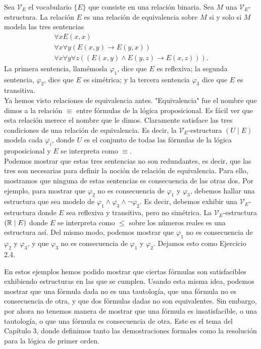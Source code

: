 \message{ !name(main.tex)}\documentclass[12pt,a4paper]{book}
\newcommand{\comillas}[1]{"#1"}
\newcommand{\VV}{\mathcal{V}}
\begin{document}
    \begin{ejemplo}\label{ej:relacion-equivalencia-fol}
        Sea $\VV_{E}$ el vocabulario $\{E\}$ que consiste en una relación binaria. Sea $M$ una $\VV_{E}$-estructura. La
        relación $E$ es una relación de equivalencia sobre $M$ si y solo si $M$ modela las tres sentencias
        \begin{gather*}
            \forall xE(x,x)\\
            \forall x\forall y(E(x,y)\rightarrow E(y,x))\\
            \forall x\forall y\forall z((E(x,y)\wedge E(y,z)\rightarrow E(x,z))).
        \end{gather*}
        La primera sentencia, llamémosla $\varphi_{1}$, dice que $E$ es reflexiva; la segunda sentencia, $\varphi_{2}$, dice
        que $E$ es simétrica; y la tercera sentencia $\varphi_{3}$ dice que $E$ es transitiva.\\
        Ya hemos visto relaciones de equivalencia antes. \comillas{Equivalencia} fue el nombre que dimos a la relación
        $\equiv$ entre fórmulas de la lógica proposicional. Es fácil ver que esta relación merece el nombre que le dimos.
        Claramente satisface las tres condiciones de una relación de equivalencia. Es decir, la $\VV_{E}$-estructura
        $(U\mid E)$ modela cada $\varphi_{i}$, donde $U$ es el conjunto de todas las fórmulas de la lógica proposicional y
        $E$ se interpreta como $\equiv$.\\
        Podemos mostrar que estas tres sentencias no son redundantes, es decir, que las tres son necesarias para definir la
        noción de relación de equivalencia. Para ello, mostramos que ninguna de estas sentencias es consecuencia de las
        otras dos. Por ejemplo, para mostrar que $\varphi_{2}$ no es consecuencia de $\varphi_{1}$ y $\varphi_{3}$, debemos
        hallar una estructura que sea modelo de $\varphi_{1}\wedge\varphi_{3}\wedge\neg\varphi_{2}$. Es decir, debemos
        exhibir una $\VV_{E}$-estructura donde $E$ sea reflexiva y transitiva, pero no simétrica. La $\VV_{E}$-estructura
        $(\mathbb{R}\mid E)$ donde $E$ se interpreta como $\leq$ sobre los números reales es una estructura así. Del mismo modo,
        podemos mostrar que $\varphi_{1}$ no es consecuencia de $\varphi_{2}$ y $\varphi_{3}$, y que $\varphi_{3}$ no es
        consecuencia de $\varphi_{1}$ y $\varphi_{2}$. Dejamos esto como Ejercicio 2.4.
    \end{ejemplo}

    En estos ejemplos hemos podido mostrar que ciertas fórmulas son satisfacibles exhibiendo estructuras en las que se
    cumplen. Usando esta misma idea, podemos mostrar que una fórmula dada no es una tautología, que una fórmula no es
    consecuencia de otra, y que dos fórmulas dadas no son equivalentes. Sin embargo, por ahora no tenemos manera de mostrar
    que una fórmula es insatisfacible, o una tautología, o que una fórmula es consecuencia de otra. Este es el tema del
    Capítulo 3, donde definimos tanto las demostraciones formales como la resolución para la lógica de primer orden.
\end{document}
